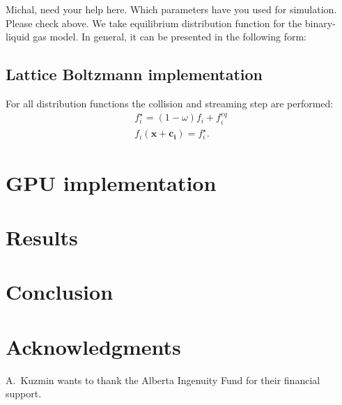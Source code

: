 \documentclass[mathpazo,sort,numbers]{cicp}
\begin{document}
{\color{red} Michal, need your help here. Which parameters have you used for simulation. Please check above.}
We take equilibrium distribution function for the binary-liquid gas model. In general, it can be presented in the following form:

\subsection{Lattice Boltzmann implementation}
For all distribution functions the collision and streaming step are performed:
\begin{equation*}
\begin{aligned}
f_i^{\star}=(1-\omega)f_i+f_i^{eq}\\
f_i(\bm{x}+\bm{c_i})=f_i^{\star}. 
\end{aligned}
\end{equation*}

\section{GPU implementation}
\section{Results}
\label{sec:benchmark}

\section{Conclusion}
\section*{Acknowledgments}
A.~Kuzmin wants to thank the Alberta Ingenuity Fund for their financial support.




\end{document}
